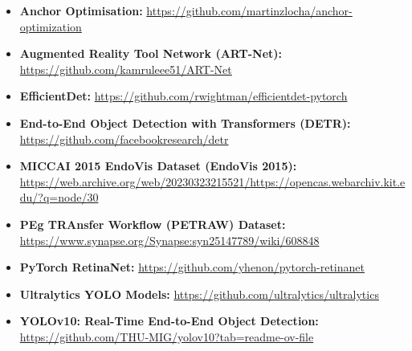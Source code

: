 \begin{itemize}[noitemsep, left=0pt]
\item \textbf{Anchor Optimisation:} \url{https://github.com/martinzlocha/anchor-optimization}
\item \textbf{Augmented Reality Tool Network (ART-Net):} \url{https://github.com/kamruleee51/ART-Net}
\item \textbf{EfficientDet:} \url{https://github.com/rwightman/efficientdet-pytorch}
\item \textbf{End-to-End Object Detection with Transformers (DETR):} \url{https://github.com/facebookresearch/detr}
\item \textbf{MICCAI 2015 EndoVis Dataset (EndoVis 2015):} \url{https://web.archive.org/web/20230323215521/https://opencas.webarchiv.kit.edu/?q=node/30}
\item \textbf{PEg TRAnsfer Workflow (PETRAW) Dataset:} \url{https://www.synapse.org/Synapse:syn25147789/wiki/608848}
\item \textbf{PyTorch RetinaNet:} \url{https://github.com/yhenon/pytorch-retinanet}
\item \textbf{Ultralytics YOLO Models:} \url{https://github.com/ultralytics/ultralytics}
\item \textbf{YOLOv10: Real-Time End-to-End Object Detection:} \url{https://github.com/THU-MIG/yolov10?tab=readme-ov-file}
\end{itemize}